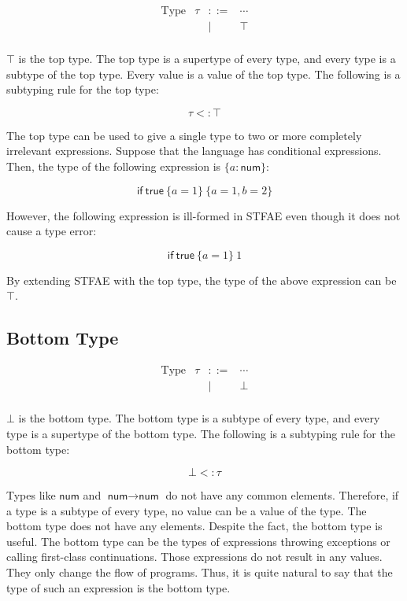 \[
\begin{array}{rrcl}
\text{Type} & \tau & ::= & \cdots \\
&&|& \top \\
\end{array}
\]

$\top$ is the top type. The top type is a supertype of every type, and every
type is a subtype of the top type. Every value is a value of the top type. The
following is a subtyping rule for the top type:

\[\tau<:\top\]

The top type can be used to give a single type to two or more completely
irrelevant expressions. Suppose that the language has conditional expressions.
Then, the type of the following expression is $\{a:\textsf{num}\}$:

\[\textsf{if}\ \textsf{true}\ \{a=1\}\ \{a=1,b=2\}\]

However, the following expression is ill-formed in STFAE even though it does not
cause a type error:

\[\textsf{if}\ \textsf{true}\ \{a=1\}\ 1\]

By extending STFAE with the top type, the type of the above expression can be
$\top$.

\subsection{Bottom Type}

\[
\begin{array}{rrcl}
\text{Type} & \tau & ::= & \cdots \\
&&|& \bot \\
\end{array}
\]

$\bot$ is the bottom type. The bottom type is a subtype of every type, and
every type is a supertype of the bottom type. The following is a subtyping rule
for the bottom type:

\[\bot<:\tau\]

Types like $\textsf{num}$ and $\textsf{num}\rightarrow\textsf{num}$ do not have any
common elements. Therefore, if a type is a subtype of every type, no value can
be a value of the type. The bottom type does not have any elements. Despite
the fact, the bottom type is useful. The bottom type can be the types of
expressions throwing exceptions or calling first-class continuations. Those
expressions do not result in any values. They only change the flow of
programs. Thus, it is quite natural to say that the type of such an expression
is the bottom type.

